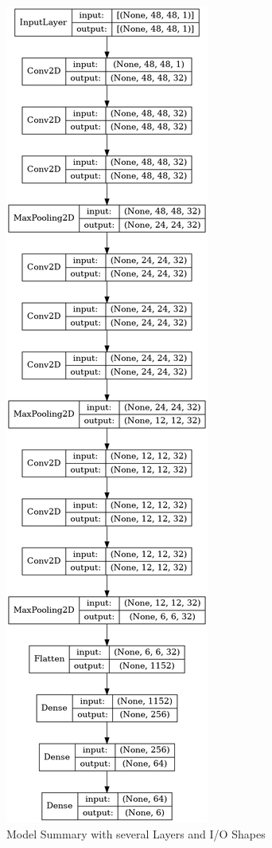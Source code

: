\documentclass[12pt, a4paper]{report}
\begin{document}
\begin{figure}[H]
\center
\includegraphics[scale=0.35]{Bilder/ModelSummary.png}
\caption{ Model Summary with several Layers and I/O Shapes }
\label{fig:Model Summary}
\end{figure}
\end{document}

